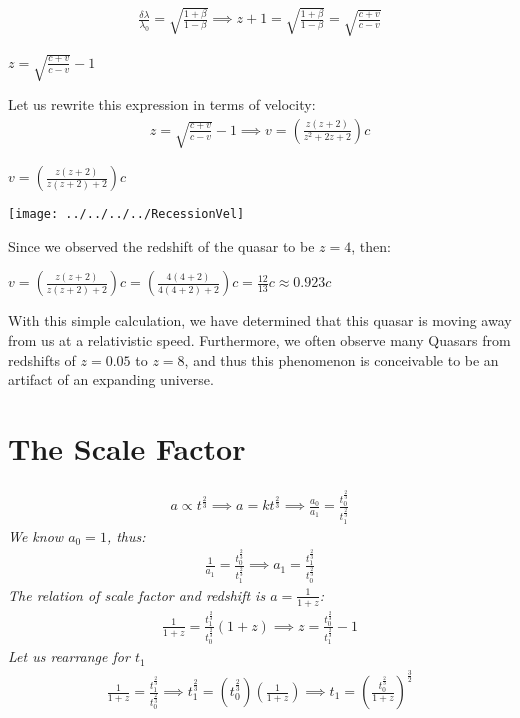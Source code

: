 \documentclass{article}
\begin{document}
{\begin{gather*}
	\frac{\delta\lambda}{\lambda_0} = \sqrt{\frac{1+\beta}{1-\beta}} \implies z + 1 = \sqrt{\frac{1+\beta}{1-\beta}} = \sqrt{\frac{c+v}{c-v}}
\end{gather*}

\begin{center}
	$\boxed{z= \sqrt{\frac{c+v}{c-v}} - 1}
	$
\end{center}

Let us rewrite this expression in terms of velocity: 
\begin{gather*}
z = \sqrt{\frac{c+v}{c-v}} - 1 \implies v = \left(\frac{z(z+2)}{z^2+2z+2}\right)c
\end{gather*}

\begin{center}
	$\boxed{v = \left(\frac{z(z+2)}{z(z+2)+2}\right)c}
	$
\end{center}
\begin{center}
	
	\texttt{[image: ../../../../RecessionVel]}
	\label{fig:recessionvel}
\end{center}
Since we observed the redshift of the quasar to be $z=4$, then:

\begin{center}
	$\boxed{v = \left(\frac{z(z+2)}{z(z+2)+2}\right)c = \left(\frac{4(4+2)}{4(4+2)+2}\right)c = \frac{12}{13}c \approx 0.923c}
	$
\end{center}

With this simple calculation, we have determined that this quasar is moving away from us at a relativistic speed. Furthermore, we often observe many Quasars from redshifts of $z=0.05$ to $z=8$, and thus this phenomenon is conceivable to be an artifact of an expanding universe. 

\section{The Scale Factor}

\begin{gather*}
a \propto t^{\frac{2}{3}} \implies a = kt^{\frac{2}{3}} \implies \frac{a_0}{a_1} = \frac{t_0^{\frac{2}{3}}}{t_1^{\frac{2}{3}}}
\end{gather*}
\textit{We know $a_0=1$, thus:}
\begin{gather*}
\frac{1}{a_1} = \frac{t_0^{\frac{2}{3}}}{t_1^{\frac{2}{3}}} \implies a_1 = \frac{t_1^{\frac{2}{3}}}{t_0^{\frac{2}{3}}}
\end{gather*}
\textit{The relation of scale factor and redshift is $a = \frac{1}{1+z}$:}
\begin{gather*}
\frac{1}{1+z} = \frac{t_1^{\frac{2}{3}}}{t_0^{\frac{2}{3}}} (1+z) \implies z = \frac{t_0^{\frac{2}{3}}}{t_1^{\frac{2}{3}}} - 1
\end{gather*}
\textit{Let us rearrange for $t_1$}
\begin{gather*}
\frac{1}{1+z} = \frac{t_1^{\frac{2}{3}}}{t_0^{\frac{2}{3}}} \implies t_1^{\frac{2}{3}} = \left(t_0^{\frac{2}{3}}\right)\left(\frac{1}{1+z}\right) \implies t_1 = \left(\frac{t_0^{\frac{2}{3}}}{1+z}\right)^{\frac{3}{2}}
\end{gather*}
}
\end{document}
